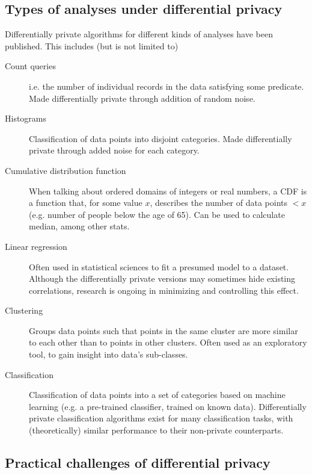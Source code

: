 \documentclass[a4paper]{article}
\begin{document}
\subsection{Types of analyses under differential privacy}

Differentially private algorithms for different kinds of analyses have been published. This includes (but is not limited to)

\begin{description}
    \item[Count queries] i.e. the number of individual records in the data satisfying some predicate. Made differentially private through addition of random noise.
    
    \item[Histograms] Classification of data points into disjoint categories. Made differentially private through added noise for each category.
    
    \item[Cumulative distribution function] When talking about ordered domains of integers or real numbers, a CDF is a function that, for some value $x$, describes the number of data points $< x$ (e.g. number of people below the age of 65). Can be used to calculate median, among other stats.
    
    \item[Linear regression] Often used in statistical sciences to fit a presumed model to a dataset. Although the differentially private versions may sometimes hide existing correlations, research is ongoing in minimizing and controlling this effect.
    
    \item[Clustering] Groups data points such that points in the same cluster are more similar to each other than to points in other clusters. Often used as an exploratory tool, to gain insight into data's sub-classes.
    
    \item[Classification] Classification of data points into a set of categories based on machine learning (e.g. a pre-trained classifier, trained on known data). Differentially private classification algorithms exist for many classification tasks, with (theoretically) similar performance to their non-private counterparts.
\end{description}

\subsection{Practical challenges of differential privacy}
\end{document}

